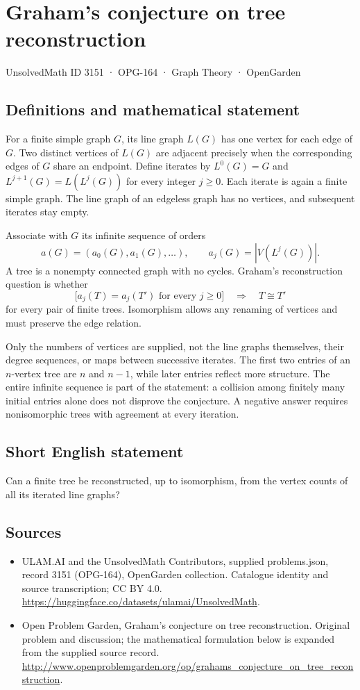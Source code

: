 \documentclass[11pt,a4paper]{article}
\begin{document}
\section*{Graham's conjecture on tree reconstruction}\label{3151}
{\small UnsolvedMath ID 3151 · OPG-164 · Graph Theory · OpenGarden}
\subsection{Definitions and mathematical statement}
For a finite simple graph $G$, its line graph $L(G)$ has one vertex
for each edge of $G$. Two distinct vertices of $L(G)$ are adjacent
precisely when the corresponding edges of $G$ share an endpoint.
Define iterates by $L^0(G)=G$ and $L^{j+1}(G)=L(L^j(G))$ for every
integer $j\geq0$. Each iterate is again a finite simple graph.
The line graph of an edgeless graph has no vertices, and subsequent
iterates stay empty.

Associate with $G$ its infinite sequence of orders
\[
 a(G)=(a_0(G),a_1(G),\ldots),\qquad a_j(G)=|V(L^j(G))|.
\]
A tree is a nonempty connected graph with no cycles. Graham's
reconstruction question is whether
\[
 \bigl[a_j(T)=a_j(T')\text{ for every }j\geq0\bigr]
 \quad\Longrightarrow\quad T\cong T'
\]
for every pair of finite trees. Isomorphism allows any renaming
of vertices and must preserve the edge relation.

Only the numbers of vertices are supplied, not the line graphs
themselves, their degree sequences, or maps between successive
iterates. The first two entries of an $n$-vertex tree are $n$ and
$n-1$, while later entries reflect more structure. The entire
infinite sequence is part of the statement: a collision among
finitely many initial entries alone does not disprove the
conjecture. A negative answer requires nonisomorphic trees with
agreement at every iteration.
\subsection{Short English statement}
Can a finite tree be reconstructed, up to isomorphism, from the vertex counts of all its iterated line graphs?
\subsection{Sources}
\begin{itemize}
\item[S1] ULAM.AI and the UnsolvedMath Contributors, supplied problems.json, record 3151 (OPG-164), OpenGarden collection. Catalogue identity and source transcription; CC BY 4.0.
\url{https://huggingface.co/datasets/ulamai/UnsolvedMath}.
\item[S2] Open Problem Garden, Graham's conjecture on tree reconstruction. Original problem and discussion; the mathematical formulation below is expanded from the supplied source record.
\url{http://www.openproblemgarden.org/op/grahams_conjecture_on_tree_reconstruction}.
\end{itemize}
\end{document}
